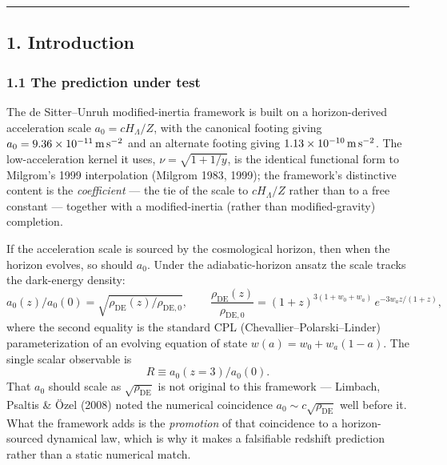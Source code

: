 \documentclass[
]{article}
\begin{document}
\begin{center}\rule{0.5\linewidth}{0.5pt}\end{center}

\subsection{1. Introduction}\label{introduction}

\subsubsection{1.1 The prediction under
test}\label{the-prediction-under-test}

The de Sitter--Unruh modified-inertia framework is built on a
horizon-derived acceleration scale \(a_0 = cH_\Lambda/Z\), with the
canonical footing giving \(a_0 = 9.36\times10^{-11}\,{\rm m\,s^{-2}}\)
and an alternate footing giving \(1.13\times10^{-10}\,{\rm m\,s^{-2}}\).
The low-acceleration kernel it uses, \(\nu = \sqrt{1+1/y}\), is the
identical functional form to Milgrom's 1999 interpolation (Milgrom 1983,
1999); the framework's distinctive content is the \emph{coefficient} ---
the tie of the scale to \(cH_\Lambda/Z\) rather than to a free constant
--- together with a modified-inertia (rather than modified-gravity)
completion.

If the acceleration scale is sourced by the cosmological horizon, then
when the horizon evolves, so should \(a_0\). Under the adiabatic-horizon
ansatz the scale tracks the dark-energy density: \[
a_0(z)/a_0(0) = \sqrt{\rho_\mathrm{DE}(z)/\rho_\mathrm{DE,0}}, \qquad
\frac{\rho_\mathrm{DE}(z)}{\rho_\mathrm{DE,0}} = (1+z)^{3(1+w_0+w_a)}\, e^{-3 w_a z/(1+z)},
\] where the second equality is the standard CPL
(Chevallier--Polarski--Linder) parameterization of an evolving equation
of state \(w(a)=w_0+w_a(1-a)\). The single scalar observable is \[
R \equiv a_0(z{=}3)/a_0(0).
\] That \(a_0\) should scale as \(\sqrt{\rho_\mathrm{DE}}\) is not original
to this framework --- Limbach, Psaltis \& Özel (2008) noted the
numerical coincidence \(a_0\sim c\sqrt{\rho_\mathrm{DE}}\) well before it.
What the framework adds is the \emph{promotion} of that coincidence to a
horizon-sourced dynamical law, which is why it makes a falsifiable
redshift prediction rather than a static numerical match.
\end{document}
